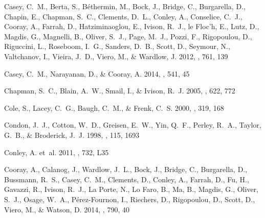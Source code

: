 \documentclass[iop]{emulateapj}
\begin{document}
\begin{thebibliography}{106}
{Casey}, C.~M., {Berta}, S., {B{\'e}thermin}, M., {Bock}, J., {Bridge}, C.,
  {Burgarella}, D., {Chapin}, E., {Chapman}, S.~C., {Clements}, D.~L.,
  {Conley}, A., {Conselice}, C.~J., {Cooray}, A., {Farrah}, D.,
  {Hatziminaoglou}, E., {Ivison}, R.~J., {le Floc'h}, E., {Lutz}, D., {Magdis},
  G., {Magnelli}, B., {Oliver}, S.~J., {Page}, M.~J., {Pozzi}, F.,
  {Rigopoulou}, D., {Riguccini}, L., {Roseboom}, I.~G., {Sanders}, D.~B.,
  {Scott}, D., {Seymour}, N., {Valtchanov}, I., {Vieira}, J.~D., {Viero}, M.,
  \& {Wardlow}, J. 2012{}, \apj, 761, 139

{Casey}, C.~M., {Narayanan}, D., \& {Cooray}, A. 2014, \physrep, 541, 45

{Chapman}, S.~C., {Blain}, A.~W., {Smail}, I., \& {Ivison}, R.~J. 2005, \apj,
  622, 772

{Cole}, S., {Lacey}, C.~G., {Baugh}, C.~M., \& {Frenk}, C.~S. 2000, \mnras,
  319, 168

{Condon}, J.~J., {Cotton}, W.~D., {Greisen}, E.~W., {Yin}, Q.~F., {Perley},
  R.~A., {Taylor}, G.~B., \& {Broderick}, J.~J. 1998, \aj, 115, 1693

{Conley}, A. {et~al.} 2011, \apjl, 732, L35

{Cooray}, A., {Calanog}, J., {Wardlow}, J.~L., {Bock}, J., {Bridge}, C.,
  {Burgarella}, D., {Bussmann}, R.~S., {Casey}, C.~M., {Clements}, D.,
  {Conley}, A., {Farrah}, D., {Fu}, H., {Gavazzi}, R., {Ivison}, R.~J., {La
  Porte}, N., {Lo Faro}, B., {Ma}, B., {Magdis}, G., {Oliver}, S.~J., {Osage},
  W.~A., {P{\'e}rez-Fournon}, I., {Riechers}, D., {Rigopoulou}, D., {Scott},
  D., {Viero}, M., \& {Watson}, D. 2014, \apj, 790, 40


\end{thebibliography}
\end{document}
